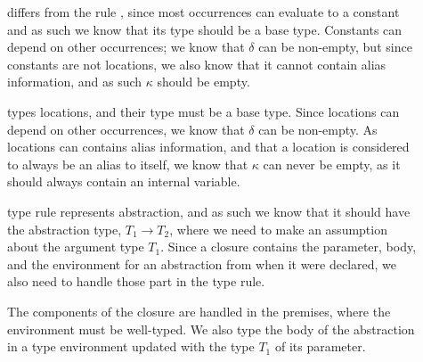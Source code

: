 \documentclass{llncs}
\begin{document}
\begin{description}
\item[] differs from the rule , since
  most occurrences can evaluate to a constant and as such we know that
  its type should be a base type. Constants can depend on other
  occurrences; we know that $\delta$ can be non-empty, but since
  constants are not locations, we also know that it cannot contain
  alias information, and as such $\kappa$ should be empty.

\item[] types locations, and their type must be a base
  type. Since locations can depend on other occurrences, we know that
  $\delta$ can be non-empty.  As locations can contains alias
  information, and that a location is considered to always be an alias
  to itself, we know that $\kappa$ can never be empty, as it should
  always contain an internal variable.

	\item[] type rule represents abstraction, and as
          such we know that it should have the abstraction type,
          $T_1\rightarrow T_2$, where we need to make an assumption
          about the argument type $T_1$. 
		Since a closure contains the parameter, body, and the
                environment for an abstraction from when it were
                declared, we also need to handle those part in the
                type rule.
                
		The components of the closure are handled in the
                premises, where the environment must be well-typed.
                We also type the body of the abstraction in a type
                environment updated with the type $T_1$ of its
                parameter.


\end{description}
\end{document}
